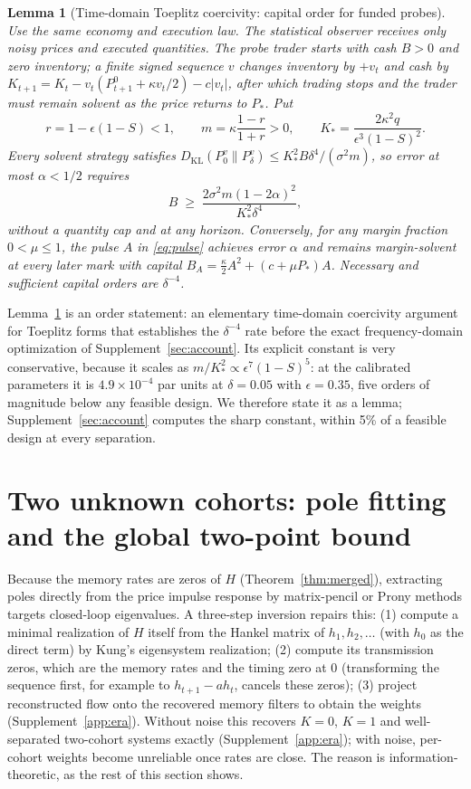 \documentclass[12pt]{article}
\newtheorem{lemma}[theorem]{Lemma}
\theoremstyle{definition}
\theoremstyle{remark}
\newcommand{\KL}{D_{\mathrm{KL}}}
\begin{document}
\begin{lemma}[Time-domain Toeplitz coercivity: capital order for funded probes]\label{thm:capital}
Use the same economy and execution law. The statistical observer receives only noisy prices and executed quantities. The probe trader starts with cash $B>0$ and zero inventory; a finite signed sequence $v$ changes inventory by $+v_t$ and cash by $K_{t+1}=K_t-v_t(P^0_{t+1}+\kappa v_t/2)-c|v_t|$, after which trading stops and the trader must remain solvent as the price returns to $P_*$. Put
\[
r=1-\epsilon(1-S)<1,\qquad m=\kappa\frac{1-r}{1+r}>0,\qquad K_*=\frac{2\kappa^2q}{\epsilon^3(1-S)^2}.
\]
Every solvent strategy satisfies $\KL(P_0^v\|P_\delta^v)\le K_*^2B\delta^4/(\sigma^2m)$, so error at most $\alpha<1/2$ requires
\begin{equation}\label{eq:Bmin}
B\;\ge\;\frac{2\sigma^2m(1-2\alpha)^2}{K_*^2\delta^4},
\end{equation}
without a quantity cap and at any horizon. Conversely, for any margin fraction $0<\mu\le1$, the pulse $A$ in \eqref{eq:pulse} achieves error $\alpha$ and remains margin-solvent at every later mark with capital $B_A=\tfrac{\kappa}{2}A^2+(c+\mu P_*)A$. Necessary and sufficient capital orders are $\delta^{-4}$.
\end{lemma}

Lemma~\ref{thm:capital} is an order statement: an elementary time-domain coercivity argument for Toeplitz forms that establishes the $\delta^{-4}$ rate before the exact frequency-domain optimization of Supplement~\ref{sec:account}. Its explicit constant is very conservative, because it scales as $m/K_*^2\propto\epsilon^7(1-S)^5$: at the calibrated parameters it is $4.9\times10^{-4}$ par units at $\delta=0.05$ with $\epsilon=0.35$, five orders of magnitude below any feasible design. We therefore state it as a lemma; Supplement~\ref{sec:account} computes the sharp constant, within 5\% of a feasible design at every separation.

\section{Two unknown cohorts: pole fitting and the global two-point bound}\label{app:twocohort}

Because the memory rates are zeros of $H$ (Theorem~\ref{thm:merged}), extracting poles directly from the price impulse response by matrix-pencil or Prony methods targets closed-loop eigenvalues. A three-step inversion repairs this: (1) compute a minimal realization of $H$ itself from the Hankel matrix of $h_1,h_2,\ldots$ (with $h_0$ as the direct term) by Kung's eigensystem realization; (2) compute its transmission zeros, which are the memory rates and the timing zero at $0$ (transforming the sequence first, for example to $h_{t+1}-ah_t$, cancels these zeros); (3) project reconstructed flow onto the recovered memory filters to obtain the weights (Supplement~\ref{app:era}). Without noise this recovers $K=0$, $K=1$ and well-separated two-cohort systems exactly (Supplement~\ref{app:era}); with noise, per-cohort weights become unreliable once rates are close. The reason is information-theoretic, as the rest of this section shows.
\end{document}

